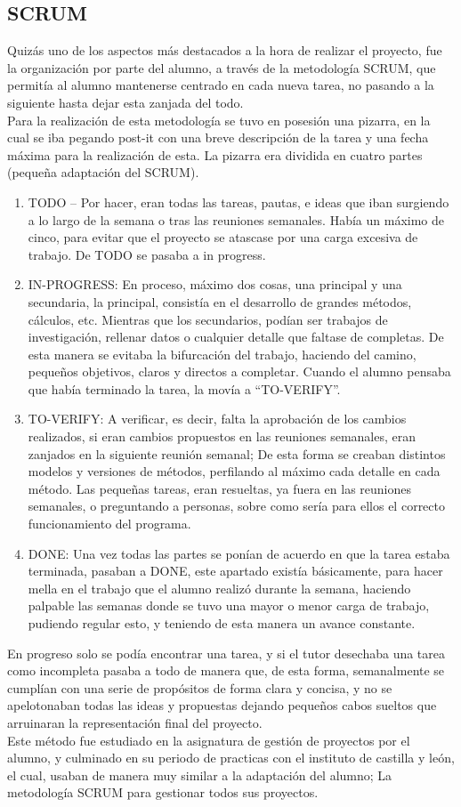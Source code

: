 \subsection{SCRUM}
Quizás uno de los aspectos más destacados a la hora de realizar el proyecto, fue la organización por parte del alumno, a través de la metodología SCRUM, que permitía al alumno mantenerse centrado en cada nueva tarea, no pasando a la siguiente hasta dejar esta zanjada del todo. \\
Para la realización de esta metodología se tuvo en posesión una pizarra, en la cual se iba pegando post-it con una breve descripción de la tarea y una fecha máxima para la realización de esta. La pizarra era dividida en cuatro partes (pequeña adaptación del SCRUM).\\
\begin{enumerate}
\item	TODO – Por hacer, eran todas las tareas, pautas, e ideas que iban surgiendo a lo largo de la semana o tras las reuniones semanales. Había un máximo de cinco, para evitar que el proyecto se atascase por una carga excesiva de trabajo. De TODO se pasaba a in progress. 
\item	IN-PROGRESS: En proceso, máximo dos cosas, una principal y una secundaria, la principal, consistía en el desarrollo de grandes métodos, cálculos, etc. Mientras que los secundarios, podían ser trabajos de investigación, rellenar datos o cualquier detalle que faltase de completas. De esta manera se evitaba la bifurcación del trabajo, haciendo del camino, pequeños objetivos, claros y directos a completar. Cuando el alumno pensaba que había terminado la tarea, la movía a “TO-VERIFY”.
\item	TO-VERIFY: A verificar, es decir, falta la aprobación de los cambios realizados, si eran cambios propuestos en las reuniones semanales, eran zanjados en la siguiente reunión semanal; De esta forma se creaban distintos modelos y versiones de métodos, perfilando al máximo cada detalle en cada método. Las pequeñas tareas, eran resueltas, ya fuera en las reuniones semanales, o preguntando a personas, sobre como sería para ellos el correcto funcionamiento del programa.
\item	DONE: Una vez todas las partes se ponían de acuerdo en que la tarea estaba terminada, pasaban a DONE, este apartado existía básicamente, para hacer mella en el trabajo que el alumno realizó durante la semana, haciendo palpable las semanas donde se tuvo una mayor o menor carga de trabajo, pudiendo regular esto, y teniendo de esta manera un avance constante.
\end{enumerate}
En progreso solo se podía encontrar una tarea, y si el tutor desechaba una tarea como incompleta pasaba a todo de manera que, de esta forma, semanalmente se cumplían con una serie de propósitos de forma clara y concisa, y no se apelotonaban todas las ideas y propuestas dejando pequeños cabos sueltos que arruinaran la representación final del proyecto. \\
Este método fue estudiado en la asignatura de gestión de proyectos por el alumno, y culminado en su periodo de practicas con el instituto de castilla y león, el cual, usaban de manera muy similar a la adaptación del alumno; La metodología SCRUM para gestionar todos sus proyectos.
